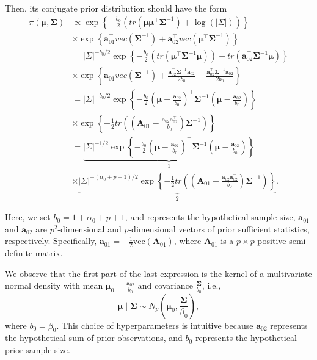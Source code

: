 \begin{enumerate}
Then, its conjugate prior distribution should have the form
\begin{align}
	\pi(\bm{\mu},\bm{\Sigma})&\propto \exp\left\{-\frac{b_0}{2}\left(tr\left(\bm{\mu}\bm{\mu}^{\top}\bm{\Sigma}^{-1}\right)+\log(|\Sigma|)\right)\right\}\nonumber\\
	&\times \exp\left\{\bm{a}_{01}^{\top} vec\left(\bm{\Sigma}^{-1}\right)+\bm{a}_{02}^{\top}vec\left(\bm{\mu}^{\top}\bm{\Sigma}^{-1}\right)\right\}\nonumber\\
	&=|\Sigma|^{-b_0/2}\exp\left\{-\frac{b_0}{2}\left(tr\left(\bm{\mu}^{\top}\bm{\Sigma}^{-1}\bm{\mu}\right)\right)+tr\left(\bm{a}_{02}^{\top}\bm{\Sigma}^{-1}\bm{\mu}\right)\right\}\nonumber\\
	&\times \exp\left\{\bm{a}_{01}^{\top} vec\left(\bm{\Sigma}^{-1}\right)+\frac{\bm{a}_{02}^{\top}\bm{\Sigma}^{-1}\bm{a}_{02}}{2b_0}-\frac{\bm{a}_{02}^{\top}\bm{\Sigma}^{-1}\bm{a}_{02}}{2b_0}\right\}\nonumber\\
	&=|\Sigma|^{-b_0/2}\exp\left\{-\frac{b_0}{2}\left(\bm{\mu}-\frac{\bm{a}_{02}}{b_0}\right)^{\top}\bm{\Sigma}^{-1}\left(\bm{\mu}-\frac{\bm{a}_{02}}{b_0}\right)\right\}\nonumber\\
	&\times \exp\left\{-\frac{1}{2}tr\left(\left(\bm{A}_{01}-\frac{\bm{a}_{02}\bm{a}_{02}^{\top}}{b_0}\right)\bm{\Sigma}^{-1}\right)\right\}\nonumber\\
	&=\underbrace{|\Sigma|^{-1/2}\exp\left\{-\frac{b_0}{2}\left(\bm{\mu}-\frac{\bm{a}_{02}}{b_0}\right)^{\top}\bm{\Sigma}^{-1}\left(\bm{\mu}-\frac{\bm{a}_{02}}{b_0}\right)\right\}}_1\nonumber\\
	&\times \underbrace{|\Sigma|^{-(\alpha_0+p+1)/2}\exp\left\{-\frac{1}{2}tr\left(\left(\bm{A}_{01}-\frac{\bm{a}_{02}\bm{a}_{02}^{\top}}{b_0}\right)\bm{\Sigma}^{-1}\right)\right\}}_2.\nonumber
\end{align}

Here, we set \( b_0 = 1 + \alpha_0 + p + 1 \), and represents the hypothetical sample size, \( \bm{a}_{01} \) and \( \bm{a}_{02} \) are \( p^2 \)-dimensional and \( p \)-dimensional vectors of prior sufficient statistics, respectively. Specifically, \( \bm{a}_{01} = -\frac{1}{2} \text{vec}(\bm{A}_{01}) \), where \( \bm{A}_{01} \) is a \( p \times p \) positive semi-definite matrix. 

We observe that the first part of the last expression is the kernel of a multivariate normal density with mean \( \bm{\mu}_0 = \frac{\bm{a}_{02}}{b_0} \) and covariance \( \frac{\bm{\Sigma}}{b_0} \), i.e.,
\[
\bm{\mu} \mid \bm{\Sigma} \sim N_p \left( \bm{\mu}_0, \frac{\bm{\Sigma}}{\beta_0} \right),
\]
where \( b_0 = \beta_0 \). This choice of hyperparameters is intuitive because \( \bm{a}_{02} \) represents the hypothetical sum of prior observations, and \( b_0 \) represents the hypothetical prior sample size.


\end{enumerate}
